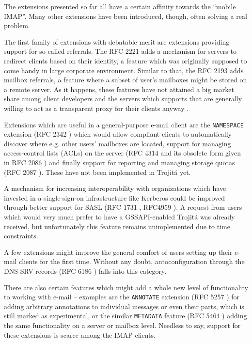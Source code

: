 \documentclass[trojita]{subfiles}
\begin{document}
The extensions presented so far all have a certain affinity towards the ``mobile IMAP''.  Many other extensions have
been introduced, though, often solving a real problem.

The first family of extensions with debatable merit are extensions providing support for so-called referrals.  The RFC
2221 \cite{rfc2221} adds a mechanism for servers to redirect clients based on their identity, a feature which was
originally supposed to come handy in large corporate environment.  Similar to that, the RFC 2193 \cite{rfc2193} adds
mailbox referrals, a feature where a subset of user's mailboxes might be stored on a remote server.  As it happens,
these features have not attained a big market share among client developers \cite{thunderbird-referrals} and the servers
which supports that are generally willing to act as a transparent proxy for their clients anyway
\cite{cyrus-referral-proxy}.

Extensions which are useful in a general-purpose e-mail client are the {\tt NAMESPACE} extension (RFC 2342
\cite{rfc2342}) which would allow compliant clients to automatically discover where e.g. other users' mailboxes are
located, support for managing access-control lists (ACLs) on the server (RFC 4314 \cite{rfc4314} and its obsolete form
given in RFC 2086 \cite{rfc2086}) and finally support for reporting and managing storage quotas (RFC 2087
\cite{rfc2087}).  These have not been implemented in Trojitá yet.

A mechanism for increasing interoperability with organizations which have invested in a single-sign-on infrastructure
like Kerberos could be improved through better support for SASL (RFC 1731 \cite{rfc1731}, RFC4959 \cite{rfc4959}).  A
request from users which would very much prefer to have a GSSAPI-enabled Trojitá was already received, but unfortunately
this feature remains unimplemented due to time constraints.

A few extensions might improve the general comfort of users setting up their e-mail clients for the first time.  Without
any doubt, autoconfiguration through the DNS SRV records (RFC 6186 \cite{rfc6186}) falls into this category.

There are also certain features which might add a whole new level of functionality to working with e-mail -- examples
are the {\tt ANNOTATE} extension (RFC 5257 \cite{rfc5257}) for adding arbitrary annotations to individual messages or
even their parts, which is still marked as experimental, or the similar {\tt METADATA} feature (RFC 5464 \cite{rfc5464})
adding the same functionality on a server or mailbox level.  Needless to say, support for these extensions is scarce
among the IMAP clients.
\end{document}
